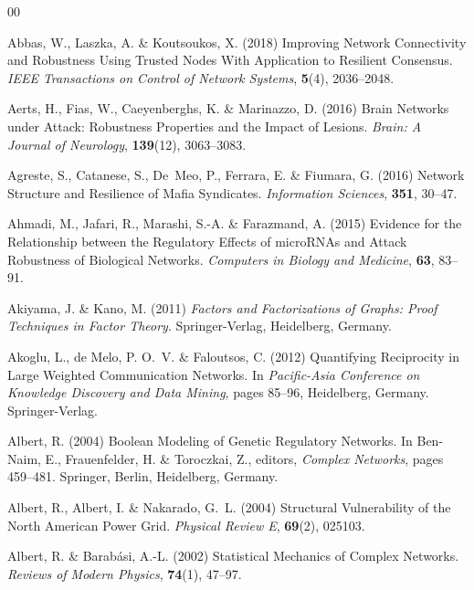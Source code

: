 \documentclass{comnet-mod}
\begin{document}

%
%


\begin{thebibliography}{00}

Abbas, W., Laszka, A. {\&} Koutsoukos, X. (2018)  {Improving {{Network
  Connectivity}} and {{Robustness Using Trusted Nodes With Application}} to
  {{Resilient Consensus}}}. {\em {IEEE Transactions on Control of Network
  Systems}}, \textbf{5}(4), 2036--2048.

Aerts, H., Fias, W., Caeyenberghs, K. {\&} Marinazzo, D. (2016)  {Brain
  Networks under Attack: {{Robustness}} Properties and the Impact of Lesions}.
  {\em {Brain: A Journal of Neurology}}, \textbf{139}(12), 3063--3083.

Agreste, S., Catanese, S., De~Meo, P., Ferrara, E. {\&} Fiumara, G. (2016)
  {Network Structure and Resilience of Mafia Syndicates}. {\em {Information
  Sciences}}, \textbf{351}, 30--47.

Ahmadi, M., Jafari, R., Marashi, S.-A. {\&} Farazmand, A. (2015)  {Evidence for
  the Relationship between the Regulatory Effects of {{microRNAs}} and Attack
  Robustness of Biological Networks}. {\em {Computers in Biology and
  Medicine}}, \textbf{63}, 83--91.

Akiyama, J. {\&} Kano, M. (2011) {\em {Factors and Factorizations of Graphs:
  {{Proof}} Techniques in Factor Theory}}.
{Springer-Verlag}, {Heidelberg, Germany}.

Akoglu, L., {de Melo}, P. O.~V. {\&} Faloutsos, C. (2012)  {Quantifying
  Reciprocity in Large Weighted Communication Networks}. In {\em {Pacific-Asia
  Conference on Knowledge Discovery and Data Mining}}, pages 85--96,
  Heidelberg, Germany. {Springer-Verlag}.

Albert, R. (2004)  Boolean Modeling of Genetic Regulatory Networks. In
  Ben-Naim, E., Frauenfelder, H. {\&} Toroczkai, Z., editors, {\em {Complex
  Networks}}, pages 459--481. Springer, Berlin, Heidelberg, Germany.

Albert, R., Albert, I. {\&} Nakarado, G.~L. (2004)  {Structural Vulnerability
  of the {{North American}} Power Grid}. {\em {Physical Review E}},
  \textbf{69}(2), 025103.

Albert, R. {\&} Barab{\'a}si, A.-L. (2002)  {Statistical Mechanics of Complex
  Networks}. {\em {Reviews of Modern Physics}}, \textbf{74}(1), 47--97.


\end{thebibliography}
\end{document}
